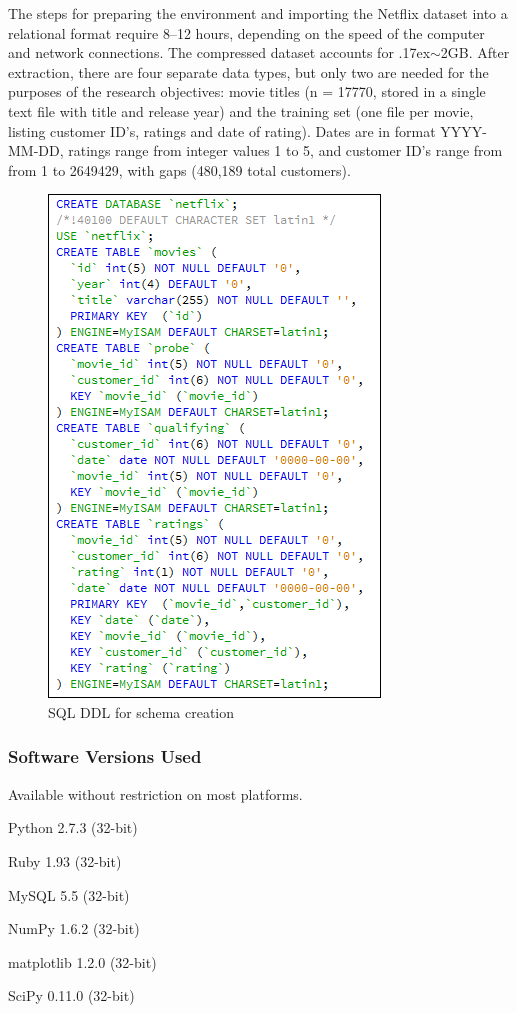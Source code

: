 \documentclass{acmtog}
\newcommand{\indentitem}{\setlength\itemindent{25pt}}
\begin{document}
The steps for preparing the environment and importing the Netflix dataset into a relational format require 8--12 hours, depending on the speed of the computer and network connections. The compressed dataset \cite{netflix-01} accounts for {\raise.17ex\hbox{$\scriptstyle\mathtt{\sim}$}}2GB. After extraction, there are four separate data types, but only two are needed for the purposes of the research objectives: movie titles (n = 17770, stored in a single text file with title and release year) and the training set (one file per movie, listing customer ID's, ratings and date of rating). Dates are in format YYYY-MM-DD, ratings range from integer values 1 to 5, and customer ID's range from from 1 to 2649429, with gaps (480,189 total customers).


\begin{figure}
\centerline{\includegraphics[scale=.6]{01schema.png}}
\caption{SQL DDL for schema creation}
\label{fig:one}
\end{figure}

\subsubsection{Software Versions Used} Available without restriction on most platforms.
\begin{itemize}
	{\indentitem\item Python 2.7.3 (32-bit)}
	{\indentitem\item Ruby 1.93 (32-bit)}
	{\indentitem\item MySQL 5.5 (32-bit)}
	{\indentitem\item NumPy 1.6.2 (32-bit)}
	{\indentitem\item matplotlib 1.2.0 (32-bit)}
	{\indentitem\item SciPy 0.11.0 (32-bit)}
\end{itemize}
\end{document}
